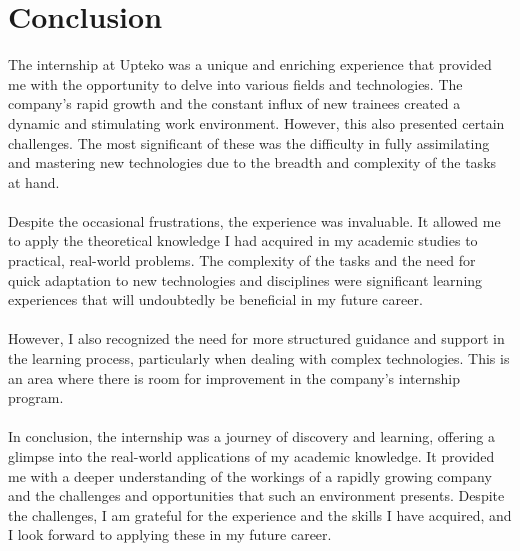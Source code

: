 \chapter*{Conclusion}


The internship at Upteko was a unique and enriching experience that provided me with the opportunity to delve into various fields and technologies. The company's rapid growth and the constant influx of new trainees created a dynamic and stimulating work environment. However, this also presented certain challenges. The most significant of these was the difficulty in fully assimilating and mastering new technologies due to the breadth and complexity of the tasks at hand.
\\ \\
Despite the occasional frustrations, the experience was invaluable. It allowed me to apply the theoretical knowledge I had acquired in my academic studies to practical, real-world problems. The complexity of the tasks and the need for quick adaptation to new technologies and disciplines were significant learning experiences that will undoubtedly be beneficial in my future career.
\\ \\
However, I also recognized the need for more structured guidance and support in the learning process, particularly when dealing with complex technologies. This is an area where there is room for improvement in the company's internship program.
\\ \\
In conclusion, the internship was a journey of discovery and learning, offering a glimpse into the real-world applications of my academic knowledge. It provided me with a deeper understanding of the workings of a rapidly growing company and the challenges and opportunities that such an environment presents. Despite the challenges, I am grateful for the experience and the skills I have acquired, and I look forward to applying these in my future career.